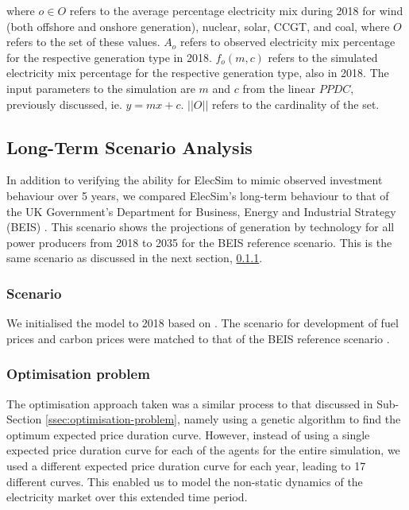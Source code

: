 \noindent where $o\in O$ refers to the average percentage electricity mix during 2018 for wind (both offshore and onshore generation), nuclear, solar, CCGT, and coal, where $O$ refers to the set of these values. $A_o$ refers to observed electricity mix percentage for the respective generation type in 2018. $f_o(m,c)$ refers to the simulated electricity mix percentage for the respective generation type, also in 2018. The input parameters to the simulation are $m$ and $c$ from the linear $PPDC$, previously discussed, ie. $y=mx+c$. $\left|\left|O\right|\right|$ refers to the cardinality of the set.



\subsection{Long-Term Scenario Analysis}
\label{sssec:scen-analysis}

In addition to verifying the ability for ElecSim to mimic observed investment behaviour over 5 years, we compared ElecSim's long-term behaviour to that of the UK Government's Department for Business, Energy and Industrial Strategy (BEIS) \cite{DBEIS2019}. This scenario shows the projections of generation by technology for all power producers from 2018 to 2035 for the BEIS reference scenario. This is the same scenario as discussed in the next section, \ref{sssec:scenario-details}.

\subsubsection{Scenario}
\label{sssec:scenario-details}

We initialised the model to 2018 based on \cite{Kell}. The scenario for development of fuel prices and carbon prices were matched to that of the BEIS reference scenario \cite{DBEIS2019}.


\subsubsection{Optimisation problem} The optimisation approach taken was a similar process to that discussed in Sub-Section \ref{ssec:optimisation-problem}, namely using a genetic algorithm to find the optimum expected price duration curve. However, instead of using a single expected price duration curve for each of the agents for the entire simulation, we used a different expected price duration curve for each year, leading to 17 different curves. This enabled us to model the non-static dynamics of the electricity market over this extended time period. 

